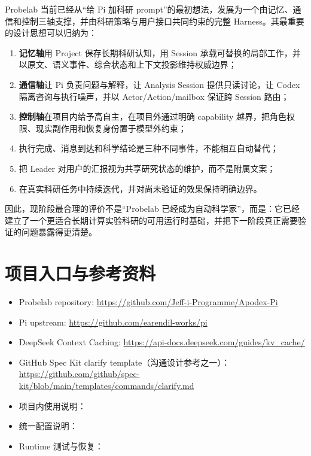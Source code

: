 \documentclass[UTF8,11pt,a4paper,fontset=fandol]{ctexart}
\newcommand{\term}[1]{\textbf{#1}}
\begin{document}
Probelab 当前已经从“给 Pi 加科研 prompt”的最初想法，发展为一个由记忆、通信和控制三轴支撑，并由科研策略与用户接口共同约束的完整 Harness。其最重要的设计思想可以归纳为：

\begin{enumerate}
  \item \term{记忆轴}用 Project 保存长期科研认知，用 Session 承载可替换的局部工作，并以原文、语义事件、综合状态和上下文投影维持权威边界；
  \item \term{通信轴}让 Pi 负责问题与解释，让 Analysis Session 提供只读讨论，让 Codex 隔离咨询与执行噪声，并以 Actor/Action/mailbox 保证跨 Session 路由；
  \item \term{控制轴}在项目内给予高自主，在项目外通过明确 capability 越界，把角色权限、现实副作用和恢复身份置于模型外约束；
  \item 执行完成、消息到达和科学结论是三种不同事件，不能相互自动替代；
  \item 把 Leader 对用户的汇报视为共享研究状态的维护，而不是附属文案；
  \item 在真实科研任务中持续迭代，并对尚未验证的效果保持明确边界。
\end{enumerate}

因此，现阶段最合理的评价不是“Probelab 已经成为自动科学家”，而是：它已经建立了一个更适合长期计算实验科研的可用运行时基础，并把下一阶段真正需要验证的问题暴露得更清楚。

\section*{项目入口与参考资料}

\begin{itemize}
  \item Probelab repository: \url{https://github.com/Jeff-i-Programme/Apodex-Pi}
  \item Pi upstream: \url{https://github.com/earendil-works/pi}
  \item DeepSeek Context Caching: \url{https://api-docs.deepseek.com/guides/kv_cache/}
  \item GitHub Spec Kit clarify template（沟通设计参考之一）：\url{https://github.com/github/spec-kit/blob/main/templates/commands/clarify.md}
  \item 项目内使用说明：
  \item 统一配置说明：
  \item Runtime 测试与恢复：
\end{itemize}
\end{document}
